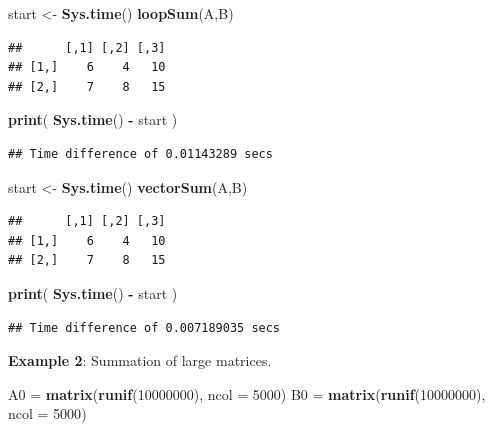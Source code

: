 \documentclass[
]{book}
\newenvironment{Shaded}{\begin{snugshade}}{\end{snugshade}}
\newcommand{\AttributeTok}[1]{\textcolor[rgb]{0.13,0.29,0.53}{#1}}
\newcommand{\DecValTok}[1]{\textcolor[rgb]{0.00,0.00,0.81}{#1}}
\newcommand{\FunctionTok}[1]{\textcolor[rgb]{0.13,0.29,0.53}{\textbf{#1}}}
\newcommand{\NormalTok}[1]{#1}
\newcommand{\OtherTok}[1]{\textcolor[rgb]{0.56,0.35,0.01}{#1}}
\newcommand{\SpecialCharTok}[1]{\textcolor[rgb]{0.81,0.36,0.00}{\textbf{#1}}}
\begin{document}
\begin{Shaded}
\begin{Highlighting}[]
\NormalTok{start }\OtherTok{\textless{}{-}} \FunctionTok{Sys.time}\NormalTok{()}
\FunctionTok{loopSum}\NormalTok{(A,B)}
\end{Highlighting}
\end{Shaded}

\begin{verbatim}
##      [,1] [,2] [,3]
## [1,]    6    4   10
## [2,]    7    8   15
\end{verbatim}

\begin{Shaded}
\begin{Highlighting}[]
\FunctionTok{print}\NormalTok{( }\FunctionTok{Sys.time}\NormalTok{() }\SpecialCharTok{{-}}\NormalTok{ start )}
\end{Highlighting}
\end{Shaded}

\begin{verbatim}
## Time difference of 0.01143289 secs
\end{verbatim}

\begin{Shaded}
\begin{Highlighting}[]
\NormalTok{start }\OtherTok{\textless{}{-}} \FunctionTok{Sys.time}\NormalTok{()}
\FunctionTok{vectorSum}\NormalTok{(A,B)}
\end{Highlighting}
\end{Shaded}

\begin{verbatim}
##      [,1] [,2] [,3]
## [1,]    6    4   10
## [2,]    7    8   15
\end{verbatim}

\begin{Shaded}
\begin{Highlighting}[]
\FunctionTok{print}\NormalTok{( }\FunctionTok{Sys.time}\NormalTok{() }\SpecialCharTok{{-}}\NormalTok{ start )}
\end{Highlighting}
\end{Shaded}

\begin{verbatim}
## Time difference of 0.007189035 secs
\end{verbatim}

\textbf{Example 2}: Summation of large matrices.

\begin{Shaded}
\begin{Highlighting}[]
\NormalTok{A0 }\OtherTok{=} \FunctionTok{matrix}\NormalTok{(}\FunctionTok{runif}\NormalTok{(}\DecValTok{10000000}\NormalTok{), }\AttributeTok{ncol =} \DecValTok{5000}\NormalTok{)}
\NormalTok{B0 }\OtherTok{=} \FunctionTok{matrix}\NormalTok{(}\FunctionTok{runif}\NormalTok{(}\DecValTok{10000000}\NormalTok{), }\AttributeTok{ncol =} \DecValTok{5000}\NormalTok{)}
\end{Highlighting}
\end{Shaded}
\end{document}

